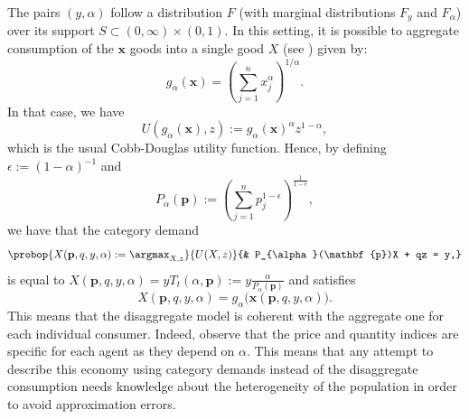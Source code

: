 \documentclass[english, a4paper,12pt]{article}
\begin{document}
The pairs $(y,\alpha)$ follow a distribution $F$ (with marginal distributions $F_{y}$ and $F_{\alpha}$) over its support $S \subset (0,\infty) \times  (0,1)$. In this setting, it is possible to aggregate consumption of the $\mathbf{x}$ goods into a single good $X$ (see ) given by: 
	\begin{equation} \label{eq:qtyindex}
		g_{\alpha}(\mathbf{x}) = \left(\sum_{j=1}^{n} x_{j}^{\alpha}\right)^{1/\alpha}.
	\end{equation}
In that case, we have
	\begin{equation} \label{eq:utilagg}
		U(g_{\alpha}(\mathbf{x}), z) := g_{\alpha}(\mathbf{x})^{\alpha}z^{1-\alpha},
	\end{equation}
which is the usual Cobb-Douglas utility function. Hence, by defining $\epsilon := (1-\alpha)^{-1}$ and
	\begin{equation} \label{eq:priceindex}
		P_{\alpha}(\mathbf{p}) :=  \left( \sum_{j=1}^{n} p_{j}^{1-\epsilon} \right)^{\frac{1}{1-\epsilon}},
	\end{equation}
we have that the category demand
	\begin{equation} \label{eq:probagg}
		\probop{X(\mathbf{p}, q, y, \alpha) := \argmax_{X, z}}{U(X,z)}
										{&	P_{\alpha}(\mathbf{p})X + qz = y,}
	\end{equation}
is equal to $X(\mathbf{p}, q,y,\alpha) = yT_{t}(\alpha, \mathbf{p}) := y \frac{\alpha}{P_{\alpha}(\mathbf{p})}$ and satisfies 
	\begin{equation} \label{eq:aggequality}
		X(\mathbf{p}, q, y, \alpha) = g_{\alpha}\big(\mathbf{x}(\mathbf{p}, q, y, \alpha)\big).
	\end{equation}
This means that the disaggregate model is coherent with the aggregate one for each individual consumer. Indeed, observe that the price and quantity indices are specific for each agent as they depend on $\alpha$. This means that any attempt to describe this economy using category demands instead of the disaggregate consumption needs knowledge about the heterogeneity of the population in order to avoid approximation errors.

\end{document}
